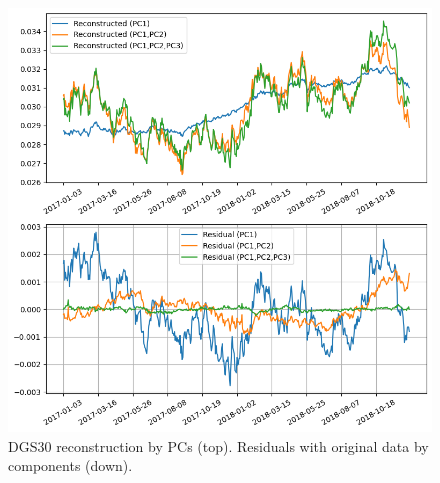 \begin{enumerate}
\begin{figure}[hp]
	\centering
	\includegraphics[width=0.7\linewidth]{figures/pca_dsg30}
	\caption{DGS30 reconstruction by PCs (top). Residuals with original data by components (down).}
	\label{fig:pca_dsg30}
\end{figure}


\end{enumerate}
